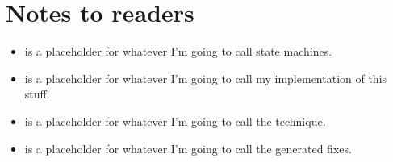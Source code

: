 \section{Notes to readers}

\begin{itemize}
\item {\STateMachine} is a placeholder for whatever I'm going to call
  state machines.
\item {\Implementation} is a placeholder for whatever I'm going to
  call my implementation of this stuff.
\item {\Technique} is a placeholder for whatever I'm going to call the
  technique.
\item {\Genfix} is a placeholder for whatever I'm going to call the
  generated fixes.
\end{itemize}

